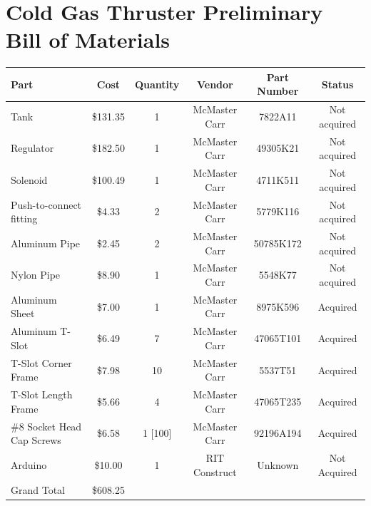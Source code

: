 \documentclass[conference]{IEEEtran} %
\begin{document}
\newpage
\section{\textbf{Cold Gas Thruster Preliminary Bill of Materials}}

\centering
\begin{tabular}{ l c c c c c }
  \hline
  Part & Cost & Quantity & Vendor & Part Number & Status \\
  \hline
  Tank & \$131.35 & 1 & McMaster Carr & 7822A11 & Not acquired \\
  Regulator & \$182.50 & 1 & McMaster Carr & 49305K21 & Not acquired \\
  Solenoid & \$100.49 & 1 & McMaster Carr & 4711K511 & Not acquired \\
  Push-to-connect fitting & \$4.33 & 2 & McMaster Carr & 5779K116 & Not acquired \\
  Aluminum Pipe & \$2.45 & 2 & McMaster Carr & 50785K172 & Not acquired \\
  Nylon Pipe & \$8.90 & 1 & McMaster Carr & 5548K77 & Not acquired \\
  Aluminum Sheet & \$7.00 & 1 & McMaster Carr & 8975K596 & Acquired \\
  Aluminum T-Slot & \$6.49 & 7 & McMaster Carr & 47065T101 & Acquired \\
  T-Slot Corner Frame & \$7.98 & 10 & McMaster Carr & 5537T51 & Acquired \\
  T-Slot Length Frame & \$5.66 & 4 & McMaster Carr & 47065T235 & Acquired \\
  \#8 Socket Head Cap Screws & \$6.58 & 1 [100] & McMaster Carr & 92196A194 & Acquired \\
  Arduino & \$10.00 & 1 & RIT Construct & Unknown & Not Acquired \\
  \hline
  Grand Total & \$608.25 &&&& \\
\end{tabular}



\newpage
\printbibliography
\end{document}
